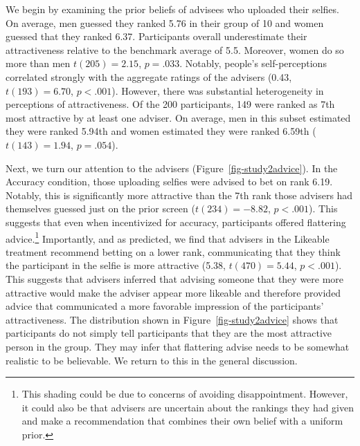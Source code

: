 \documentclass[
  man,
  floatsintext,
  longtable,
  nolmodern,
  notxfonts,
  notimes,
  colorlinks=true,linkcolor=blue,citecolor=blue,urlcolor=blue]{apa7}
\begin{document}
We begin by examining the prior beliefs of advisees who uploaded their
selfies. On average, men guessed they ranked 5.76 in their group of 10
and women guessed that they ranked 6.37. Participants overall
underestimate their attractiveness relative to the benchmark average of
5.5. Moreover, women do so more than men \(t(205) = 2.15\),
\(p = .033\). Notably, people's self-perceptions correlated strongly
with the aggregate ratings of the advisers (0.43, \(t(193) = 6.70\),
\(p < .001\)). However, there was substantial heterogeneity in
perceptions of attractiveness. Of the 200 participants, 149 were ranked
as 7th most attractive by at least one adviser. On average, men in this
subset estimated they were ranked 5.94th and women estimated they were
ranked 6.59th (\(t(143) = 1.94\), \(p = .054\)).

Next, we turn our attention to the advisers
(Figure~\ref{fig-study2advice}). In the Accuracy condition, those
uploading selfies were advised to bet on rank 6.19. Notably, this is
significantly more attractive than the 7th rank those advisers had
themselves guessed just on the prior screen (\(t(234) = -8.82\),
\(p < .001\)). This suggests that even when incentivized for accuracy,
participants offered flattering advice.\footnote{This shading could be
  due to concerns of avoiding disappointment. However, it could also be
  that advisers are uncertain about the rankings they had given and make
  a recommendation that combines their own belief with a uniform prior.}
Importantly, and as predicted, we find that advisers in the Likeable
treatment recommend betting on a lower rank, communicating that they
think the participant in the selfie is more attractive (5.38,
\(t(470) = 5.44\), \(p < .001\)). This suggests that advisers inferred
that advising someone that they were more attractive would make the
adviser appear more likeable and therefore provided advice that
communicated a more favorable impression of the participants'
attractiveness. The distribution shown in Figure~\ref{fig-study2advice}
shows that participants do not simply tell participants that they are
the most attractive person in the group. They may infer that flattering
advise needs to be somewhat realistic to be believable. We return to
this in the general discussion.
\end{document}
